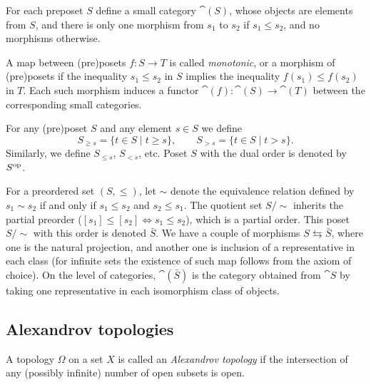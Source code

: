 \begin{con}\label{conCatOfPoset}
For each preposet $S$ define a small category $\cat(S)$, whose objects are elements from $S$, and there is only one morphism from $s_1$ to $s_2$ if $s_1\leq s_2$, and no morphisms otherwise.
\end{con}

A map between (pre)posets $f\colon S\to T$ is called \emph{monotonic}, or a morphism of (pre)posets if the inequality $s_1\leq s_2$ in $S$ implies the inequality $f(s_1)\leq f(s_2)$ in $T$. Each such morphism induces a functor $\cat(f)\colon \cat(S)\to \cat(T)$ between the corresponding small categories.

\begin{con}\label{conLowerUpperSetNotation}
For any (pre)poset $S$ and any element $s\in S$ we define
\[
S_{\geq s}=\{t\in S\mid t\geq s\},\qquad S_{>s}=\{t\in S\mid t>s\}.
\]
Similarly, we define $S_{\leq s}$, $S_{<s}$, etc. Poset $S$ with the dual order is denoted by $S^{\operatorname{op}}$.
\end{con}

\begin{con}\label{conPreposetToPoset}
For a preordered set $(S,\leq)$, let $\sim$ denote the equivalence relation defined by $s_1\sim s_2$ if and only if $s_1\leq s_2$ and $s_2\leq s_1$. The quotient set $S/\sim$ inherits the partial preorder ($[s_1]\leq[s_2]\Leftrightarrow s_1\leq s_2$), which is a partial order. This poset $S/\sim$ with this order is denoted $\bar{S}$. We have a couple of morphisms $S\leftrightarrows \bar{S}$, where one is the natural projection, and another one is inclusion of a representative in each class (for infinite sets the existence of such map follows from the axiom of choice). On the level of categories, $\cat(\bar{S})$ is the category obtained from $\cat{S}$ by taking one representative in each isomorphism class of objects.
\end{con}

\subsection{Alexandrov topologies}\label{subsecMathAlexandrov}

\begin{defin}\label{defAlexandrovTopology}
A topology $\Omega$ on a set $X$ is called an \emph{Alexandrov topology} if the intersection of any (possibly infinite) number of open subsets is open.
\end{defin}

